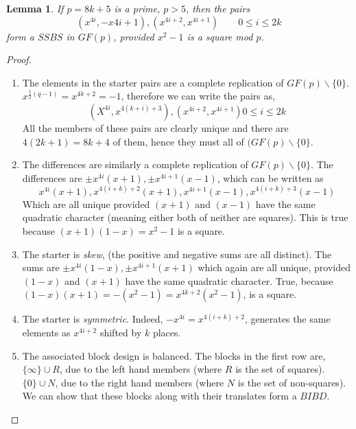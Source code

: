 \documentclass[
  11pt,
  a4paper]{book}
\newtheorem{lemma}[theorem]{Lemma}
\begin{document}
\begin{lemma}
If $p = 8k + 5$ is a prime, $p > 5$, then the pairs
\begin{equation}
(x^{4i}, -x{4i + 1}), (x^{4i + 2}, x^{4i + 1}) \qquad 0 \leq i \leq 2k
\end{equation}
form a $SSBS$ in $GF(p)$, provided $x^2 - 1$ is a square mod
$p$.
\end{lemma}
\begin{proof}
\begin{enumerate}
\item{The elements in the starter pairs are a complete
    replication of $GF(p) \backslash \{0\}$.
    $x^{\frac{1}{2} (q - 1)} = x^{4k + 2} = -1$, therefore we
    can write the pairs as,
    $$(X^{4i}, x^{4(k + i) + 3}), (x^{4i + 2}, x^{4i + 1}) 0 \leq i \leq 2k$$
    All the members of these pairs are clearly unique and
    there are $4(2k + 1) = 8k + 4$ of them, hence they must all of
    $(GF(p) \backslash \{0\}$.}
\item{The differences are similarly a complete replication of
    $GF(p) \backslash \{0\}$. The differences are
    $\pm x^{4i}(x + 1), \pm x^{4i + 1}(x - 1)$, which can be written
    as
    $$x^{4i}(x + 1), x^{4(i + k) + 2}(x + 1), x^{4i + 1}(x - 1), x^{4(i + k) + 3}(x-1)$$
    Which are all unique provided $(x + 1)$ and $(x - 1)$ have
    the same quadratic character (meaning either both of
    neither are squares).  This is true because
    $(x + 1)(1 - x) = x^2 - 1$ is a square.}
\item{The starter is \emph{skew}, (the positive and negative sums
    are all distinct).  The sums are
    $\pm x^{4i}(1 - x), \pm x^{4i + 1}(x + 1)$
    which again are all unique, provided
    $(1 - x)$ and $(x + 1)$ have the same quadratic
    character.  True, because
    $(1 - x)(x  +1) = -(x^2 - 1) = x^{4k + 2}(x^2  -1)$, is a square.}
\item{The starter is \emph{symmetric}.
    Indeed, $-x^{4i} = x^{4(i + k) + 2}$, generates the
    same elements as $x^{4i + 2}$ shifted by $k$ places.}
\item{The associated block design is balanced.  The blocks in
    the first row are, $\{\infty\} \cup R$, due to the left
    hand members (where $R$ is the set of squares).
    $\{0\} \cup N$, due to the right hand members (where
    $N$ is the set of non-squares).
    We can show that these blocks along with their translates
    form a $BIBD$.
    
}
\end{enumerate}
\end{proof}
\end{document}
